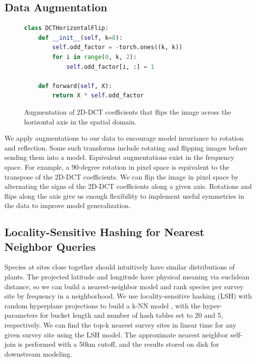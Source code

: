 \subsection{Data Augmentation}

\begin{figure}[h!]
\begin{lstlisting}[language=Python,frame=single]
class DCTHorizontalFlip:
    def __init__(self, k=8):
        self.odd_factor = -torch.ones((k, k))
        for i in range(0, k, 2):
            self.odd_factor[i, :] = 1

    def forward(self, X):
        return X * self.odd_factor
\end{lstlisting}
\caption{Augmentation of 2D-DCT coefficients that flips the image across the horizontal axis in the spatial domain.}
\label{lst:augmentation}
\end{figure}

We apply augmentations to our data to encourage model invariance to rotation and reflection.
Some such transforms include rotating and flipping images before sending them into a model.
Equivalent augmentations exist in the frequency space.
For example, a 90-degree rotation in pixel space is equivalent to the transpose of the 2D-DCT coefficients.
We can flip the image in pixel space by alternating the signs of the 2D-DCT coefficients along a given axis.
Rotations and flips along the axis give us enough flexibility to implement useful symmetries in the data to improve model generalization.

\subsection{Locality-Sensitive Hashing for Nearest Neighbor Queries}

Species at sites close together should intuitively have similar distributions of plants. 
The projected latitude and longitude have physical meaning via euclidean distance, so we can build a nearest-neighbor model and rank species per survey site by frequency in a neighborhood.
We use locality-sensitive hashing (LSH) with random hyperplane projections to build a k-NN model \cite{leskovec2020mining}, with the hyper-parameters for bucket length and number of hash tables set to 20 and 5, respectively.
We can find the top-k nearest survey sites in linear time for any given survey site using the LSH model.
The approximate nearest neighbor self-join is performed with a 50km cutoff, and the results stored on disk for downstream modeling.

